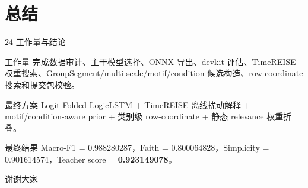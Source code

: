\documentclass[aspectratio=169]{beamer}
\begin{document}
\section{总结}

\begin{frame}{24 工作量与结论}
    \begin{block}{工作量}
        完成数据审计、主干模型选择、ONNX 导出、devkit 评估、TimeREISE 权重搜索、GroupSegment/multi-scale/motif/condition 候选构造、row-coordinate 搜索和提交包校验。
    \end{block}
    \begin{block}{最终方案}
        Logit-Folded LogicLSTM + TimeREISE 离线扰动解释 + motif/condition-aware prior + 类别级 row-coordinate + 静态 relevance 权重折叠。
    \end{block}
    \begin{block}{最终结果}
        Macro-F1 = 0.988280287，Faith = 0.800064828，Simplicity = 0.901614574，Teacher score = \textbf{0.923149078}。
    \end{block}
    \begin{center}
        \large 谢谢大家
    \end{center}
\end{frame}
\end{document}
